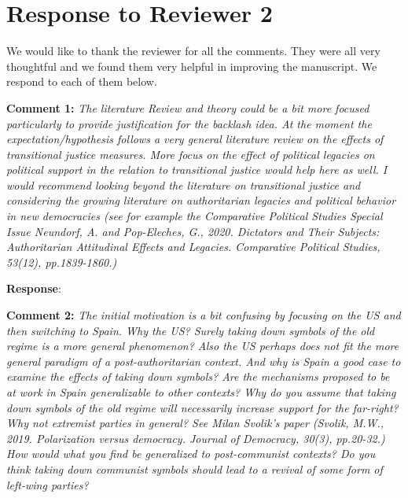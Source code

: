 \documentclass[12pt, a4paper, notitlepage]{article}
\begin{document}
\newpage
\section*{Response to Reviewer 2}

We would like to thank the reviewer for all the comments. They were all very thoughtful and we found them very helpful in improving the manuscript. We respond to each of them below.

\textbf{Comment 1:} \textit{The literature Review and theory could be a bit more focused particularly to provide justification for the backlash idea. At the moment the expectation/hypothesis follows a very general literature review on the effects of transitional justice measures. More focus on the effect of political legacies on political support in the relation to transitional justice would help here as well. I would recommend looking beyond the literature on transitional justice and considering the growing literature on authoritarian legacies and political behavior in new democracies (see for example the Comparative Political Studies Special Issue Neundorf, A. and Pop-Eleches, G., 2020. Dictators and Their Subjects: Authoritarian Attitudinal Effects and Legacies. Comparative Political Studies, 53(12), pp.1839-1860.)}

\textbf{Response}: {}

\textbf{Comment 2:} \textit{The initial motivation is a bit confusing by focusing on the US and then switching to Spain. Why the US? Surely taking down symbols of the old regime is a more general phenomenon? Also the US perhaps does not fit the more general paradigm of a post-authoritarian context. And why is Spain a good case to examine the effects of taking down symbols? Are the mechanisms proposed to be at work in Spain generalizable to other contexts? Why do you assume that taking down symbols of the old regime will necessarily increase support for the far-right? Why not extremist parties in general? See Milan Svolik’s paper (Svolik, M.W., 2019. Polarization versus democracy. Journal of Democracy, 30(3), pp.20-32.) How would what you find be generalized to post-communist contexts? Do you think taking down communist symbols should lead to a revival of some form of left-wing parties?}
\end{document}
